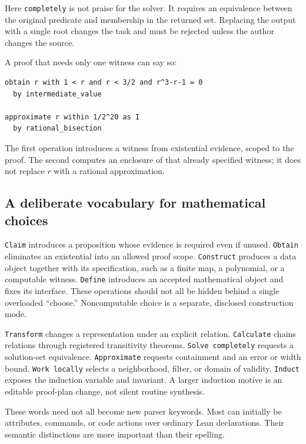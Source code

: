 \documentclass[11pt,letterpaper]{article}
\newcommand{\code}[1]{\nolinkurl{#1}}
\theoremstyle{definition}
\begin{document}
Here \code{completely} is not praise for the solver. It requires an equivalence
between the original predicate and membership in the returned set. Replacing the
output with a single root changes the task and must be rejected unless the author
changes the source.

A proof that needs only one witness can say so:
\begin{lstlisting}
obtain r with 1 < r and r < 3/2 and r^3-r-1 = 0
  by intermediate_value

approximate r within 1/2^20 as I
  by rational_bisection
\end{lstlisting}
The first operation introduces a witness from existential evidence, scoped to the
proof. The second computes an enclosure of that already specified witness; it does
not replace \(r\) with a rational approximation.

\subsection{A deliberate vocabulary for mathematical choices}
\code{Claim} introduces a proposition whose evidence is required even if unused.
\code{Obtain} eliminates an existential into an allowed proof scope.
\code{Construct} produces a data object together with its specification, such as a
finite map, a polynomial, or a computable witness. \code{Define} introduces an
accepted mathematical object and fixes its interface. These operations should not
all be hidden behind a single overloaded ``choose.'' Noncomputable choice is a
separate, disclosed construction mode.

\code{Transform} changes a representation under an explicit relation.
\code{Calculate} chains relations through registered transitivity theorems.
\code{Solve completely} requests a solution-set equivalence.
\code{Approximate} requests containment and an error or width bound.
\code{Work locally} selects a neighborhood, filter, or domain of validity.
\code{Induct} exposes the induction variable and invariant. A larger induction
motive is an editable proof-plan change, not silent routine synthesis.

These words need not all become new parser keywords. Most can initially be
attributes, commands, or code actions over ordinary Lean declarations. Their
semantic distinctions are more important than their spelling.
\end{document}
